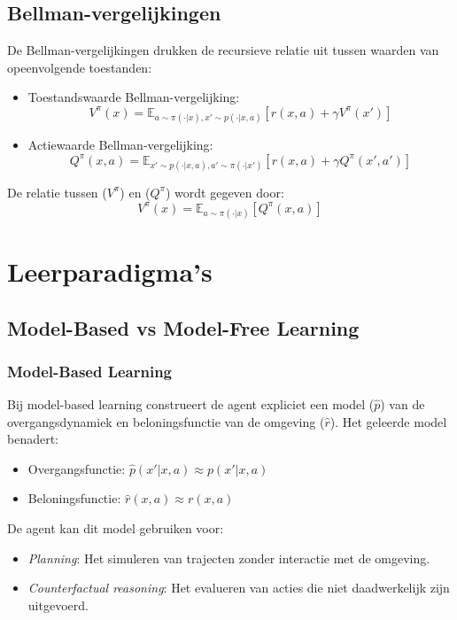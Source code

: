 \documentclass[a4paper,12pt]{report}
\begin{document}
\subsection{Bellman-vergelijkingen}
De Bellman-vergelijkingen drukken de recursieve relatie uit tussen waarden van
opeenvolgende toestanden:
\begin{itemize}
    \item Toestandswaarde Bellman-vergelijking:
          \[
              V^\pi(x) = \mathbb{E}_{a \sim \pi(\cdot|x), x' \sim p(\cdot|x,a)}[r(x,a) + \gamma V^\pi(x')]
          \]
    \item Actiewaarde Bellman-vergelijking:
          \[
              Q^\pi(x,a) = \mathbb{E}_{x' \sim p(\cdot|x,a), a' \sim \pi(\cdot|x')}[r(x,a) + \gamma Q^\pi(x',a')]
          \]
\end{itemize}
De relatie tussen (\(V^\pi\)) en (\(Q^\pi\)) wordt gegeven door:
\[
    V^\pi(x) = \mathbb{E}_{a \sim \pi(\cdot|x)}[Q^\pi(x,a)]
\]

\section{Leerparadigma's}
\subsection{Model-Based vs Model-Free Learning}
\subsubsection{Model-Based Learning}
Bij model-based learning construeert de agent expliciet een model (\(\hat{p}\))
van de overgangsdynamiek en beloningsfunctie van de omgeving (\(\hat{r}\)). Het
geleerde model benadert:

\begin{itemize}
    \item Overgangsfunctie: \(\hat{p}(x'|x,a) \approx p(x'|x,a)\)
    \item Beloningsfunctie: \(\hat{r}(x,a) \approx r(x,a)\)
\end{itemize}

De agent kan dit model gebruiken voor:

\begin{itemize}
    \item \textit{Planning}: Het simuleren van trajecten zonder interactie met de omgeving.
    \item \textit{Counterfactual reasoning}: Het evalueren van acties die niet daadwerkelijk zijn uitgevoerd.
\end{itemize}
\end{document}
